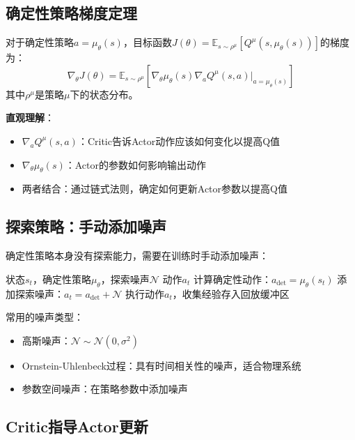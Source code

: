 \subsection{确定性策略梯度定理}

\begin{theorem}[确定性策略梯度定理]
对于确定性策略$a = \mu_\theta(s)$，目标函数$J(\theta) = \mathbb{E}_{s \sim \rho^\mu}[Q^\mu(s, \mu_\theta(s))]$的梯度为：
\[
\nabla_\theta J(\theta) = \mathbb{E}_{s \sim \rho^\mu}[\nabla_\theta \mu_\theta(s) \nabla_a Q^\mu(s, a)|_{a=\mu_\theta(s)}]
\]
其中$\rho^\mu$是策略$\mu$下的状态分布。
\end{theorem}

\textbf{直观理解}：
\begin{itemize}
    \item $\nabla_a Q^\mu(s, a)$：Critic告诉Actor动作应该如何变化以提高Q值
    \item $\nabla_\theta \mu_\theta(s)$：Actor的参数如何影响输出动作
    \item 两者结合：通过链式法则，确定如何更新Actor参数以提高Q值
\end{itemize}

\subsection{探索策略：手动添加噪声}

确定性策略本身没有探索能力，需要在训练时手动添加噪声：

\begin{algorithm}[H]
\caption{确定性策略的探索}
\begin{algorithmic}[1]
\REQUIRE 状态$s_t$，确定性策略$\mu_\theta$，探索噪声$\mathcal{N}$
\ENSURE 动作$a_t$
\STATE 计算确定性动作：$a_{\text{det}} = \mu_\theta(s_t)$
\STATE 添加探索噪声：$a_t = a_{\text{det}} + \mathcal{N}$
\STATE 执行动作$a_t$，收集经验存入回放缓冲区
\end{algorithmic}
\end{algorithm}

常用的噪声类型：
\begin{itemize}
    \item 高斯噪声：$\mathcal{N} \sim \mathcal{N}(0, \sigma^2)$
    \item Ornstein-Uhlenbeck过程：具有时间相关性的噪声，适合物理系统
    \item 参数空间噪声：在策略参数中添加噪声
\end{itemize}

\subsection{Critic指导Actor更新}


